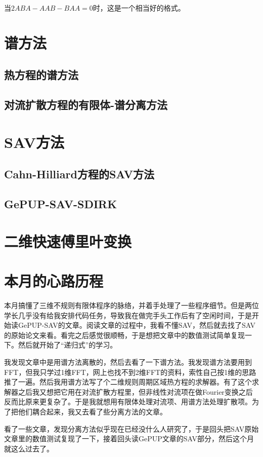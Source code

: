 \documentclass[lang=cn,10pt,bibend=bibtex]{elegantbook}
\begin{document}
当$2ABA-AAB-BAA=0$时，这是一个相当好的格式。

\vspace{5em}

\chapter{谱方法}

\section{热方程的谱方法}

\section{对流扩散方程的有限体-谱分离方法}

\chapter{SAV方法}

\section{Cahn-Hilliard方程的SAV方法}

\section{GePUP-SAV-SDIRK}

\printbibliography[heading=bibintoc,title=\ebibname]

\appendix

\chapter{二维快速傅里叶变换}

\chapter{本月的心路历程}

本月搞懂了三维不规则有限体程序的脉络，并着手处理了一些程序细节。但是两位学长几乎没有给我安排代码任务，导致我在做完手头工作后有了空闲时间，于是开始读GePUP-SAV的文章。阅读文章的过程中，我看不懂SAV，然后就去找了SAV的原始论文来看。看完之后感觉很顺畅，于是想把文章中的数值测试简单复现一下。然后就开始了“递归式”的学习。

我发现文章中是用谱方法离散的，然后去看了一下谱方法。我发现谱方法要用到FFT，但我只学过1维FFT，网上也找不到2维FFT的资料，索性自己按1维的思路推了一遍。然后我用谱方法写了个二维规则周期区域热方程的求解器。有了这个求解器之后我又想把它用在对流扩散方程里，但非线性对流项在做Fourier变换之后反而比原来更复杂了。于是我就想用有限体处理对流项、用谱方法处理扩散项。为了把他们耦合起来，我又去看了些分离方法的文章。

看了一些文章，发现分离方法似乎现在已经没什么人研究了，于是回头把SAV原始文章里的数值测试复现了一下，接着回头读GePUP文章的SAV部分，然后这个月就这么过去了。
\end{document}

